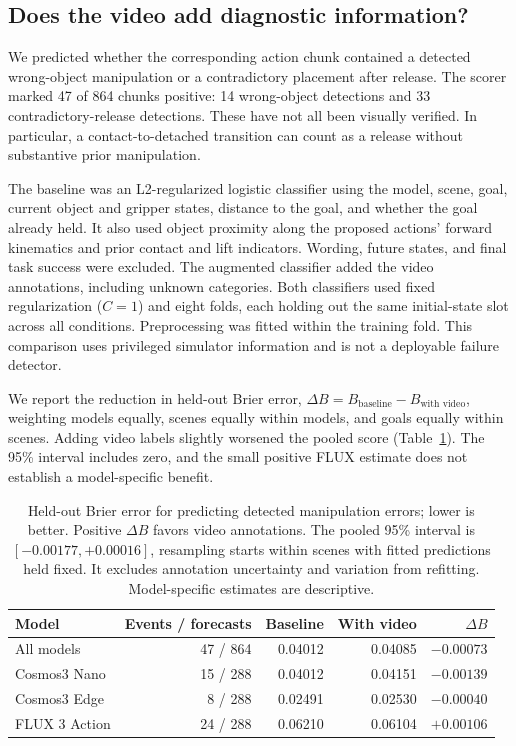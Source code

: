 \documentclass{article}
\begin{document}
\subsection{Does the video add diagnostic information?}

We predicted whether the corresponding action chunk contained a detected wrong-object manipulation or a contradictory placement after release. The scorer marked 47 of 864 chunks positive: 14 wrong-object detections and 33 contradictory-release detections. These have not all been visually verified. In particular, a contact-to-detached transition can count as a release without substantive prior manipulation.

The baseline was an L2-regularized logistic classifier using the model, scene, goal, current object and gripper states, distance to the goal, and whether the goal already held. It also used object proximity along the proposed actions' forward kinematics and prior contact and lift indicators. Wording, future states, and final task success were excluded. The augmented classifier added the video annotations, including unknown categories. Both classifiers used fixed regularization ($C=1$) and eight folds, each holding out the same initial-state slot across all conditions. Preprocessing was fitted within the training fold. This comparison uses privileged simulator information and is not a deployable failure detector.

We report the reduction in held-out Brier error, $\Delta B = B_{\text{baseline}}-B_{\text{with video}}$, weighting models equally, scenes equally within models, and goals equally within scenes. Adding video labels slightly worsened the pooled score (Table~\ref{tab:forecast-utility}). The 95\% interval includes zero, and the small positive FLUX estimate does not establish a model-specific benefit.

\begin{table}[htbp]
\centering
\small
\begin{tabular}{lrrrr}
\toprule
Model & Events / forecasts & Baseline & With video & $\Delta B$ \\
\midrule
All models & 47 / 864 & 0.04012 & 0.04085 & $-0.00073$ \\
Cosmos3 Nano & 15 / 288 & 0.04012 & 0.04151 & $-0.00139$ \\
Cosmos3 Edge & 8 / 288 & 0.02491 & 0.02530 & $-0.00040$ \\
FLUX 3 Action & 24 / 288 & 0.06210 & 0.06104 & $+0.00106$ \\
\bottomrule
\end{tabular}
\caption{Held-out Brier error for predicting detected manipulation errors; lower is better. Positive $\Delta B$ favors video annotations. The pooled 95\% interval is $[-0.00177,+0.00016]$, resampling starts within scenes with fitted predictions held fixed. It excludes annotation uncertainty and variation from refitting. Model-specific estimates are descriptive.}
\label{tab:forecast-utility}
\end{table}
\end{document}
